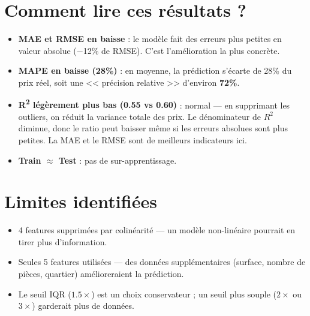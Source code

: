 \documentclass[a4paper,11pt]{article}
\begin{document}
\section{Comment lire ces r\'esultats ?}

\begin{itemize}
    \item \textbf{MAE et RMSE en baisse} : le mod\`ele fait des erreurs plus petites en valeur absolue ($-$12\% de RMSE). C'est l'am\'elioration la plus concr\`ete.
    \item \textbf{MAPE en baisse (28\%)} : en moyenne, la pr\'ediction s'\'ecarte de 28\% du prix r\'eel, soit une << pr\'ecision relative >> d'environ \textbf{72\%}.
    \item \textbf{R\textsuperscript{2} l\'eg\`erement plus bas (0.55 vs 0.60)} : normal --- en supprimant les outliers, on r\'eduit la variance totale des prix. Le d\'enominateur de $R^2$ diminue, donc le ratio peut baisser m\^eme si les erreurs absolues sont plus petites. La MAE et le RMSE sont de meilleurs indicateurs ici.
    \item \textbf{Train $\approx$ Test} : pas de sur-apprentissage.
\end{itemize}

\section{Limites identifi\'ees}

\begin{itemize}
    \item 4 features supprim\'ees par colin\'earit\'e --- un mod\`ele non-lin\'eaire pourrait en tirer plus d'information.
    \item Seules 5 features utilis\'ees --- des donn\'ees suppl\'ementaires (surface, nombre de pi\`eces, quartier) am\'elioreraient la pr\'ediction.
    \item Le seuil IQR ($1.5 \times$) est un choix conservateur ; un seuil plus souple ($2 \times$ ou $3 \times$) garderait plus de donn\'ees.
\end{itemize}
\end{document}
